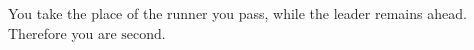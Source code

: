 You take the place of the runner you pass, while the leader remains ahead. Therefore you are $\boxed{\text{second}}$.
